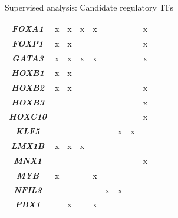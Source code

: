 \documentclass[slidestop,compress,11pt,xcolor=dvipsnames]{beamer}
\begin{document}
\begin{frame}{Supervised analysis: Candidate regulatory TFs }
\begin{table}[]
\begin{tabular}{@{}|c|c|c|c|c|c|c|c|c|@{}}
\textit{\textbf{FOXA1}} & x & x & x & x &  &  &  & x \\
\textit{\textbf{FOXP1}} & x & x &  &  &  &  &  & x \\
\textit{\textbf{GATA3}} & x & x & x & x &  &  &  & x \\
\textit{\textbf{HOXB1}} & x & x &  &  &  &  &  &  \\
\textit{\textbf{HOXB2}} & x & x &  &  &  &  &  & x \\
\textit{\textbf{HOXB3}} &  &  &  &  &  &  &  & x \\
\textit{\textbf{HOXC10}} &  &  &  &  &  &  &  & x \\
\textit{\textbf{KLF5}} &  &  &  &  &  & x & x &  \\
\textit{\textbf{LMX1B}} & x & x & x &  &  &  &  &  \\
\textit{\textbf{MNX1}} &  &  &  &  &  &  &  & x \\
\textit{\textbf{MYB}} & x &  &  & x &  &  &  &  \\
\textit{\textbf{NFIL3}} &  &  &  &  & x & x &  &  \\
\textit{\textbf{PBX1}} &  & x &  & x &  &  &  &  \\

\end{tabular}
\end{table}
\end{frame}
\end{document}
